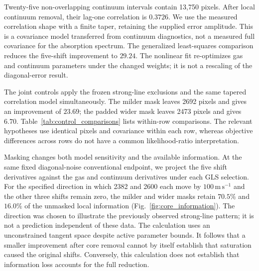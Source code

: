 Twenty-five non-overlapping continuum intervals contain 13,750 pixels. After local continuum removal, their lag-one correlation is $0.3726$. We use the measured correlation shape with a finite taper, retaining the supplied error amplitude. This is a covariance model transferred from continuum diagnostics, not a measured full covariance for the absorption spectrum. The generalized least-squares comparison reduces the five-shift improvement to $29.24$. The nonlinear fit re-optimizes gas and continuum parameters under the changed weights; it is not a rescaling of the diagonal-error result.

The joint controls apply the frozen strong-line exclusions and the same tapered correlation model simultaneously. The milder mask leaves 2692 pixels and gives an improvement of $23.69$; the padded wider mask leaves 2473 pixels and gives $6.70$. Table~\ref{tab:control_comparisons} lists within-row comparisons. The relevant hypotheses use identical pixels and covariance within each row, whereas objective differences across rows do not have a common likelihood-ratio interpretation.

\begin{table}[htbp]
\centering
\caption{Conditional reference-spectrum comparisons. $k_0$ counts conventional-model parameters; each alternative adds five shifts. GLS retains the supplied variance amplitude. All rows describe selected bounded local endpoints, with no global-optimum certification.}
\label{tab:control_comparisons}
\small

\end{table}

Masking changes both model sensitivity and the available information. At the same fixed diagonal-noise conventional endpoint, we project the five shift derivatives against the gas and continuum derivatives under each GLS selection. For the specified direction in which 2382 and 2600 each move by $100\,\mathrm{m\,s^{-1}}$ and the other three shifts remain zero, the milder and wider masks retain $70.5\%$ and $16.0\%$ of the unmasked local information (Fig.~\ref{fig:core_information}). The direction was chosen to illustrate the previously observed strong-line pattern; it is not a prediction independent of these data. The calculation uses an unconstrained tangent space despite active parameter bounds. It follows that a smaller improvement after core removal cannot by itself establish that saturation caused the original shifts. Conversely, this calculation does not establish that information loss accounts for the full reduction.

